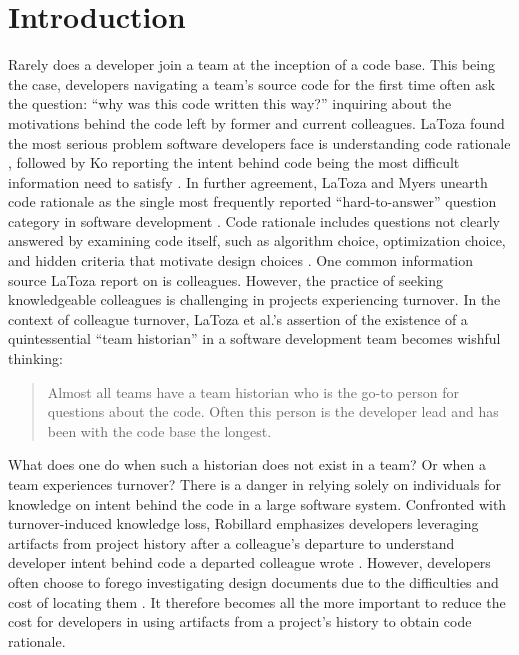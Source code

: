
\chapter{Introduction}
\label{ch:Introduction}


Rarely does a developer join a team at the inception of a code base. 
This being the case, developers navigating a team's source code for the first time often ask the question: ``why was this code written this way?'' inquiring about the motivations behind the code left by former and current colleagues.
LaToza \etal found the most serious problem software developers face is understanding code rationale \cite{latoza_maintaining_2006}, followed by Ko \etal reporting the intent behind code being the most difficult information need to satisfy \cite{ko_information_2007}. 
In further agreement, LaToza and Myers unearth code rationale as the single most frequently reported “hard-to-answer” question category in software development \cite{latoza_hard-answer_2010}. 
Code rationale includes questions not clearly answered by examining code itself, such as algorithm choice, optimization choice, and hidden criteria that motivate design choices \cite{latoza_hard-answer_2010}. 
One common information source LaToza \etal report on is colleagues. 
However, the practice of seeking knowledgeable colleagues is challenging in projects experiencing turnover. 
In the context of colleague turnover, LaToza et al.'s assertion of the existence of a quintessential ``team historian'' in a software development team \cite{latoza_maintaining_2006} becomes wishful thinking:

\begin{quote}
Almost all teams have a team historian who is the go-to person for questions about the
code. Often this person is the developer lead and has been with the code base the longest.
\end{quote}

What does one do when such a historian does not exist in a team? Or when a team experiences turnover?
There is a danger in relying solely on individuals for knowledge on intent behind the code in a large software system.
Confronted with turnover-induced knowledge loss, Robillard emphasizes developers leveraging artifacts from project history after a colleague’s departure to understand developer intent behind code a departed colleague wrote \cite{robillard_turnover-induced_2021}. 
However, developers often choose to forego investigating design documents due to the difficulties and cost of locating them \cite{latoza_maintaining_2006}.
It therefore becomes all the more important to reduce the cost for developers in using artifacts from a project's history to obtain code rationale. 

